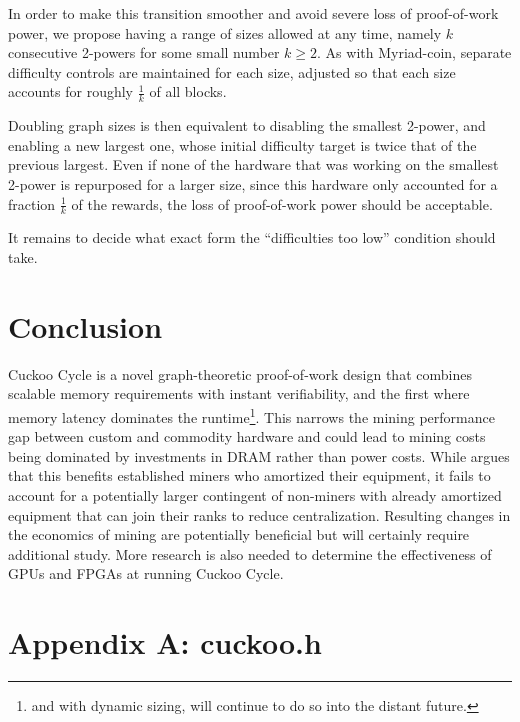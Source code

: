 \documentclass[11pt, oneside]{article}
\begin{document}
In order to make this transition smoother and avoid severe loss of proof-of-work power,
we propose having a range of sizes allowed at any time,
namely $k$ consecutive 2-powers for some small number $k\geq 2$.
As with Myriad-coin, separate difficulty controls are maintained for each size,
adjusted so that each size accounts for roughly $\frac{1}{k}$ of all blocks.

Doubling graph sizes is then equivalent to disabling the smallest 2-power,
and enabling a new largest one, whose initial difficulty target is twice that of the previous largest.
Even if none of the hardware that was working on the smallest 2-power is repurposed for a larger size,
since this hardware only accounted for a fraction $\frac{1}{k}$ of the rewards, the loss of
proof-of-work power should be acceptable.

It remains to decide what exact form the ``difficulties too low'' condition should take.

\section{Conclusion}
Cuckoo Cycle is a novel graph-theoretic proof-of-work design that combines scalable
memory requirements with instant verifiability, and the first where
memory latency dominates the runtime\footnote{and with dynamic sizing,
will continue to do so into the distant future.}.
This narrows the mining performance gap between custom and commodity hardware and
could lead to mining costs being dominated by investments in DRAM rather than power costs.
While \cite{poelstra2014} argues that this benefits established miners who amortized
their equipment, it fails to account for a potentially larger contingent of
non-miners with already amortized equipment that can join their ranks to reduce centralization.
Resulting changes in the economics of mining are potentially beneficial but
will certainly require additional study.
More research is also needed to determine the effectiveness of GPUs and FPGAs
at running Cuckoo Cycle.




\lstset{language=C,basicstyle=\footnotesize}
\section{Appendix A: cuckoo.h}


%

%
\end{document}
